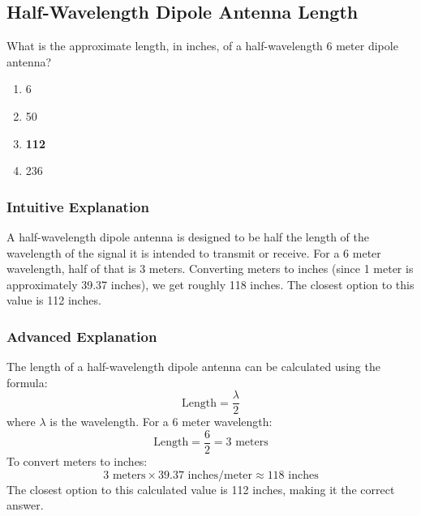 \subsection{Half-Wavelength Dipole Antenna Length}
\label{T9A09}

\begin{tcolorbox}[colback=gray!10!white,colframe=black!75!black,title=T9A09]
What is the approximate length, in inches, of a half-wavelength 6 meter dipole antenna?
\begin{enumerate}[noitemsep]
    \item 6
    \item 50
    \item \textbf{112}
    \item 236
\end{enumerate}
\end{tcolorbox}

\subsubsection*{Intuitive Explanation}
A half-wavelength dipole antenna is designed to be half the length of the wavelength of the signal it is intended to transmit or receive. For a 6 meter wavelength, half of that is 3 meters. Converting meters to inches (since 1 meter is approximately 39.37 inches), we get roughly 118 inches. The closest option to this value is 112 inches.

\subsubsection*{Advanced Explanation}
The length of a half-wavelength dipole antenna can be calculated using the formula:
\[
\text{Length} = \frac{\lambda}{2}
\]
where \(\lambda\) is the wavelength. For a 6 meter wavelength:
\[
\text{Length} = \frac{6}{2} = 3 \text{ meters}
\]
To convert meters to inches:
\[
3 \text{ meters} \times 39.37 \text{ inches/meter} \approx 118 \text{ inches}
\]
The closest option to this calculated value is 112 inches, making it the correct answer.